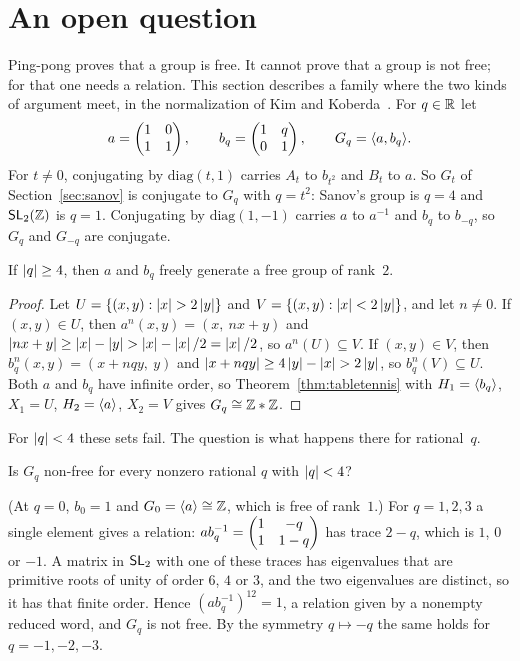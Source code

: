 \section{An open question}\label{sec:open}

Ping-pong proves that a group is free. It cannot prove that a group is not
free; for that one needs a relation. This section describes a family where
the two kinds of argument meet, in the normalization of Kim and
Koberda~\cite{kim-koberda-2019}. For $q \in \mathbb{R}$ let
\[
  a = \begin{pmatrix} 1 & 0 \\ 1 & 1\end{pmatrix}, \qquad b_q = \begin{pmatrix} 1 & q \\ 0 & 1\end{pmatrix}, \qquad
  G_q = \langle a, b_q \rangle.
\]
For $t \ne 0$, conjugating by $\mathrm{diag}(t, 1)$ carries $A_t$ to $b_{t^2}$
and $B_t$ to $a$. So $G_t$ of Section~\ref{sec:sanov} is conjugate to $G_q$
with $q = t^2$: Sanov's group is $q = 4$ and $\mathsf{SL}_2(\mathbb{Z})$ is $q = 1$.
Conjugating by $\mathrm{diag}(1,-1)$ carries $a$ to $a^{-1}$ and $b_q$ to
$b_{-q}$, so $G_q$ and $G_{-q}$ are conjugate.

\begin{proposition}\label{prop:q-free}
If $\left|q\right| \ge 4$, then $a$ and $b_q$ freely generate a free group of
rank~$2$.
\end{proposition}

\begin{proof}
Let $U = \{(x,y) : \left|x\right| > 2\left|y\right|\}$ and
$V = \{(x,y) : \left|x\right| < 2\left|y\right|\}$, and let $n \ne 0$. If $(x,y) \in U$,
then $a^n(x,y) = (x,\ nx + y)$ and
$\left|nx + y\right| \ge \left|x\right| - \left|y\right| > \left|x\right| - \left|x\right|/2 = \left|x\right|/2$, so
$a^n(U) \subseteq V$. If $(x,y) \in V$, then $b_q^n(x,y) = (x + nqy,\ y)$
and $\left|x + nqy\right| \ge 4\left|y\right| - \left|x\right| > 2\left|y\right|$, so
$b_q^n(V) \subseteq U$. Both $a$ and $b_q$ have infinite order, so
Theorem~\ref{thm:tabletennis} with $H_1 = \langle b_q \rangle$, $X_1 = U$,
$H_2 = \langle a \rangle$, $X_2 = V$ gives $G_q \cong \mathbb{Z} * \mathbb{Z}$.
\end{proof}

For $\left|q\right| < 4$ these sets fail. The question is what happens there for
rational~$q$.

\begin{question}\label{q:rational}
Is $G_q$ non-free for every nonzero rational $q$ with $\left|q\right| < 4$?
\end{question}

(At $q = 0$, $b_0 = 1$ and $G_0 = \langle a \rangle \cong \mathbb{Z}$, which is free of rank~$1$.) For $q = 1, 2, 3$ a single element
gives a relation: $a b_q^{-1} = \begin{pmatrix} 1 & -q \\ 1 & 1-q\end{pmatrix}$ has trace $2 - q$, which
is $1$, $0$ or $-1$. A matrix in $\mathsf{SL}_2$ with one of these traces has
eigenvalues that are primitive roots of unity of order $6$, $4$ or $3$, and
the two eigenvalues are distinct, so it has that finite order. Hence
$(a b_q^{-1})^{12} = 1$, a relation given by a nonempty reduced word, and
$G_q$ is not free. By the symmetry $q \mapsto -q$ the same holds for
$q = -1, -2, -3$.

